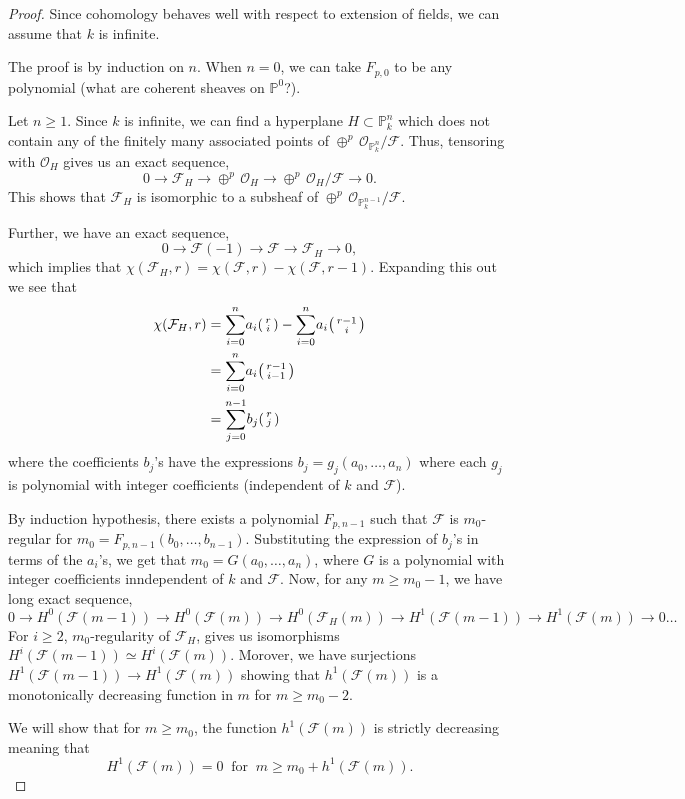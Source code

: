 \documentclass[ignorenonframetext,t]{beamer}
\newcommand{\sF}{{\mathcal F}}
\newcommand{\sO}{{\mathcal O}}
\renewcommand{\P}{{\mathbb P}}
\theoremstyle{definition}
\begin{document}
\begin{proof}
	Since cohomology behaves well with respect to extension of fields, we can assume that $k$ is infinite.
	
	The proof is by induction on $n$. When $n=0$, we can take $F_{p,0}$ to be any polynomial (what are coherent sheaves on $\P^0$?).
	
	Let $n\geq 1$. Since $k$ is infinite, we can find a hyperplane $H\subset \P^n_k$ which does not contain any of the finitely many associated points of $\oplus^p\,\sO_{\P^n_k}/\sF$. Thus, tensoring with $\sO_H$ gives us an exact sequence,
	\[0\rightarrow \sF_H \rightarrow \oplus^p\,\sO_H \rightarrow \oplus^p\,\sO_H/\sF \rightarrow 0.\]
	This shows that $\sF_H$ is isomorphic to a subsheaf of $\oplus^p\,\sO_{\P^{n-1}_k}/\sF$.
	
	Further, we have an exact sequence,
	\[0 \rightarrow \sF(-1)\rightarrow \sF \rightarrow \sF_H \rightarrow 0,\]
	which implies that $\chi(\sF_H,r)=\chi(\sF,r)-\chi(\sF,r-1)$. Expanding this out we see that
	\begin{align*}
	\chi(\sF_H,r)
	&=\overset{n}{\underset{i=0}{\sum}} a_i 
	\begin{psmallmatrix}
	r\\
	i	
	\end{psmallmatrix} -
	\overset{n}{\underset{i=0}{\sum}} a_i 
	\begin{psmallmatrix}
	r-1\\
	i	
	\end{psmallmatrix}\\
	&=\overset{n}{\underset{i=0}{\sum}} a_i 
	\begin{psmallmatrix}
	r-1\\
	i-1	
	\end{psmallmatrix}\\
	&=\overset{n-1}{\underset{j=0}{\sum}} b_j 
	\begin{psmallmatrix}
	r\\
	j	
	\end{psmallmatrix}
	\end{align*}
	where the coefficients $b_j$'s have the expressions $b_j=g_j(a_0,\ldots,a_n)$ where each $g_j$ is polynomial with integer coefficients (independent of $k$ and $\sF$).
	
	By induction hypothesis, there exists a polynomial $F_{p,n-1}$ such that $\sF$ is $m_0$-regular for $m_0=F_{p,n-1}(b_0,\ldots,b_{n-1})$. Substituting the expression of $b_j$'s in terms of the $a_i$'s, we get that $m_0=G(a_0,\ldots,a_n)$, where $G$ is a polynomial with integer coefficients inndependent of $k$ and $\sF$. Now, for any $m\geq m_0-1$, we have long exact sequence,
	\[0\rightarrow H^0(\sF(m-1))\rightarrow H^0(\sF(m))\rightarrow H^0(\sF_H(m))\rightarrow H^1(\sF(m-1))\rightarrow H^1(\sF(m)) \rightarrow 0 \ldots\]
	For $i\geq 2$, $m_0$-regularity of $\sF_H$, gives us isomorphisms $H^i(\sF(m-1))\simeq H^i(\sF(m))$. Morover, we have surjections $H^1(\sF(m-1))\rightarrow H^1(\sF(m))$ showing that $h^1(\sF(m))$ is a monotonically decreasing function in $m$ for $m\geq m_0 -2$.
	
	We will show that for $m\geq m_0$, the function $h^1(\sF(m))$ is strictly decreasing meaning that 
	\[H^1(\sF(m))=0 \;\;\text{for}\;\; m\geq m_0+h^1(\sF(m)).\]
	
	
\end{proof}




\end{document}
